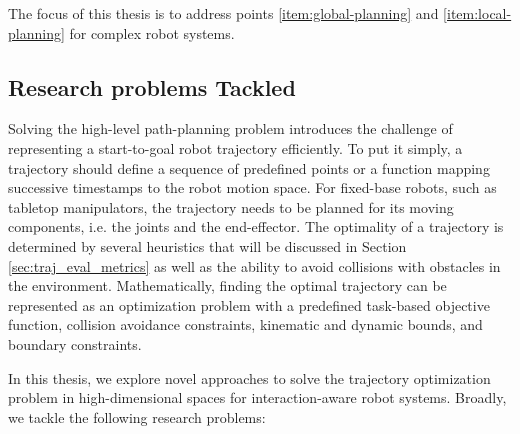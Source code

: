 The focus of this thesis is to address points \ref{item:global-planning} and \ref{item:local-planning} for complex robot systems.

\subsection{Research problems Tackled}

Solving the high-level path-planning problem introduces the challenge of representing a start-to-goal robot trajectory efficiently. To put it simply, a trajectory should define a sequence of predefined points or a function mapping successive timestamps to the robot motion space. For fixed-base robots, such as tabletop manipulators, the trajectory needs to be planned for its moving components, i.e. the joints and the end-effector. The optimality of a trajectory is determined by several heuristics that will be discussed in Section \ref{sec:traj_eval_metrics} as well as the ability to avoid collisions with obstacles in the environment. Mathematically, finding the optimal trajectory can be represented as an optimization problem with a predefined task-based objective function, collision avoidance constraints, kinematic and dynamic bounds, and boundary constraints. 


In this thesis, we explore novel approaches to solve the trajectory optimization problem in high-dimensional spaces for interaction-aware robot systems. Broadly, we tackle the following research problems:

